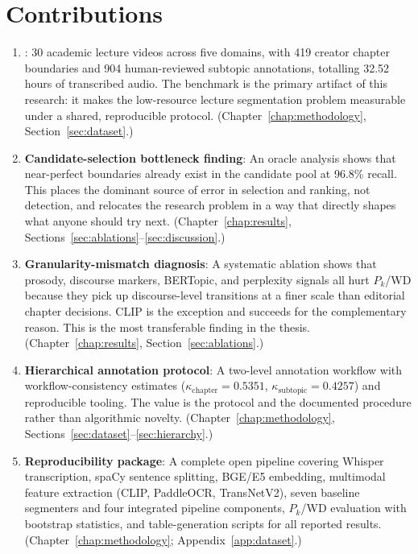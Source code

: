 \section{Contributions}
\label{sec:contributions}

\begin{enumerate}
  \item \textbf{\dataset{}}: 30 academic lecture videos across five domains,
    with 419 creator chapter boundaries and 904 human-reviewed subtopic
    annotations, totalling 32.52 hours of transcribed audio. The benchmark
    is the primary artifact of this research: it makes the low-resource lecture
    segmentation problem measurable under a shared, reproducible protocol.
    (Chapter~\ref{chap:methodology}, Section~\ref{sec:dataset}.)

  \item \textbf{Candidate-selection bottleneck finding}: An oracle analysis
    shows that near-perfect boundaries already exist in the candidate pool at
    96.8\% recall. This places the dominant source of error in selection and
    ranking, not detection, and relocates the research problem in a way that
    directly shapes what anyone should try next.
    (Chapter~\ref{chap:results}, Sections~\ref{sec:ablations}--\ref{sec:discussion}.)

  \item \textbf{Granularity-mismatch diagnosis}: A systematic ablation shows
    that prosody, discourse markers, BERTopic, and perplexity signals all hurt
    $P_k$/WD because they pick up discourse-level transitions at a finer scale
    than editorial chapter decisions. CLIP is the exception and succeeds for
    the complementary reason. This is the most transferable finding in the
    thesis.
    (Chapter~\ref{chap:results}, Section~\ref{sec:ablations}.)

  \item \textbf{Hierarchical annotation protocol}: A two-level annotation
    workflow with workflow-consistency estimates
    ($\kappa_{\text{chapter}}=0.5351$, $\kappa_{\text{subtopic}}=0.4257$)
    and reproducible tooling. The value is the protocol and the documented
    procedure rather than algorithmic novelty.
    (Chapter~\ref{chap:methodology}, Sections~\ref{sec:dataset}--\ref{sec:hierarchy}.)

  \item \textbf{Reproducibility package}: A complete open pipeline covering
    Whisper transcription, spaCy sentence splitting, BGE/E5 embedding,
    multimodal feature extraction (CLIP, PaddleOCR, TransNetV2), seven
    baseline segmenters and four integrated pipeline components,
    $P_k$/WD evaluation with bootstrap statistics, and table-generation
    scripts for all reported results.
    (Chapter~\ref{chap:methodology}; Appendix~\ref{app:dataset}.)
\end{enumerate}

